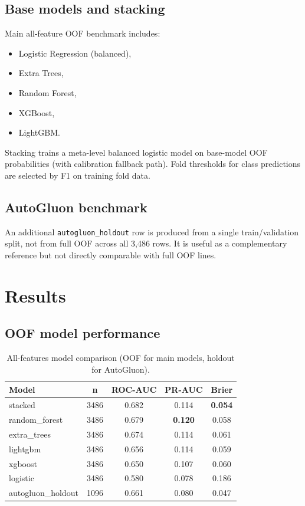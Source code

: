 \documentclass[11pt, a4paper]{article}
\begin{document}
\subsection{Base models and stacking}
Main all-feature OOF benchmark includes:
\begin{itemize}
    \item Logistic Regression (balanced),
    \item Extra Trees,
    \item Random Forest,
    \item XGBoost,
    \item LightGBM.
\end{itemize}
Stacking trains a meta-level balanced logistic model on base-model OOF probabilities (with calibration fallback path). Fold thresholds for class predictions are selected by F1 on training fold data.

\subsection{AutoGluon benchmark}
An additional \texttt{autogluon\_holdout} row is produced from a single train/validation split, not from full OOF across all 3,486 rows. It is useful as a complementary reference but not directly comparable with full OOF lines.

\section{Results}

\subsection{OOF model performance}
\begin{table}[htbp]
\centering
\caption{All-features model comparison (OOF for main models, holdout for AutoGluon).}
\label{tab:oof_results}
\begin{tabular}{lcccc}
\toprule
Model & n & ROC-AUC & PR-AUC & Brier \\
\midrule
stacked & 3486 & 0.682 & 0.114 & \textbf{0.054} \\
random\_forest & 3486 & 0.679 & \textbf{0.120} & 0.058 \\
extra\_trees & 3486 & 0.674 & 0.114 & 0.061 \\
lightgbm & 3486 & 0.656 & 0.114 & 0.059 \\
xgboost & 3486 & 0.650 & 0.107 & 0.060 \\
logistic & 3486 & 0.580 & 0.078 & 0.186 \\
\midrule
autogluon\_holdout & 1096 & 0.661 & 0.080 & 0.047 \\
\bottomrule
\end{tabular}
\end{table}
\end{document}

